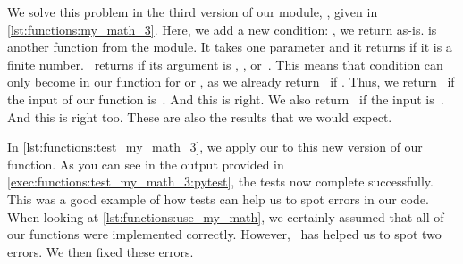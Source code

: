 %
%
%
%
%
%
%
%
%
\begin{sloppypar}%
We solve this problem in the third version of our module, , given in \cref{lst:functions:my_math_3}.
Here, we add a new condition: , we return  as-is.
 is another function from the  module.
It takes one parameter and it returns  if it is a finite number.
~returns  if its argument is , , or~.
This means that condition can only become  in our function for  or , as we already return~ if .
Thus, we return ~if the input of our function is~.
And this is right.
We also return ~if the input is~.
And this is right too.
These are also the results that we would expect.%
\end{sloppypar}%
%
In \cref{lst:functions:test_my_math_3}, we apply our  to this new version of our  function.
As you can see in the output provided in \cref{exec:functions:test_my_math_3:pytest}, the tests now complete successfully.
This was a good example of how tests can help us to spot errors in our code.
When looking at \cref{lst:functions:use_my_math}, we certainly assumed that all of our functions were implemented correctly.
However, \pytest\ has helped us to spot two errors.
We then fixed these errors.%
%
%
%
